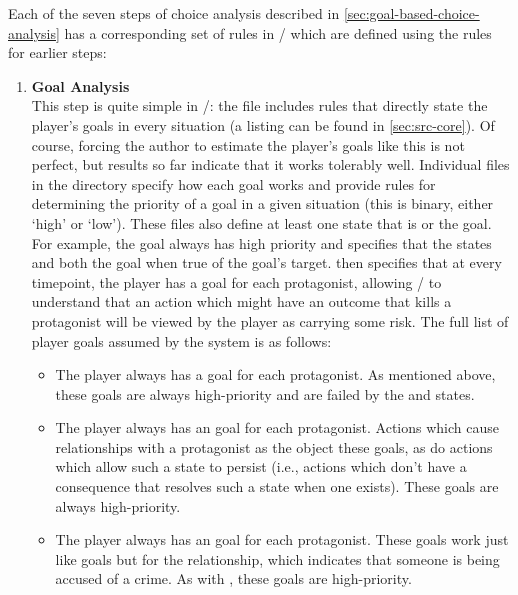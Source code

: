 Each of the seven steps of choice analysis described in \cref{sec:goal-based-choice-analysis} has a corresponding set of rules in \dunyazad/ which are defined using the rules for earlier steps:
%
\begin{enumerate}[leftmargin=1.4em]
\setlength{\parindent}{1.5em}
\item %
\textbf{Goal Analysis} \\
%
This step is quite simple in \dunyazad/: the file  includes rules that directly state the player's goals in every situation (a listing can be found in \cref{sec:src-core}).
%
Of course, forcing the author to estimate the player's goals like this is not perfect, but results so far indicate that it works tolerably well.
%
Individual files in the  directory specify how each goal works and provide rules for determining the priority of a goal in a given situation (this is binary, either `high' or `low').
%
These files also define at least one state that is    or  the goal.
%
For example, the  goal always has high priority and specifies that the states  and  both  the goal when true of the goal's target.
%
 then specifies that at every timepoint, the player has a  goal for each protagonist, allowing \dunyazad/ to understand that an action which might have an outcome that kills a protagonist will be viewed by the player as carrying some risk.
%
The full list of player goals assumed by the system is as follows:
%
\begin{itemize}
\item The player always has a  goal for each protagonist. As mentioned above, these goals are always high-priority and are failed by the  and  states.
\item The player always has an  goal for each protagonist. Actions which cause  relationships with a protagonist as the object  these goals, as do actions which allow such a state to persist (i.e., actions which don't have a consequence that resolves such a state when one exists). These goals are always high-priority.
\item The player always has an  goal for each protagonist. These goals work just like  goals but for the  relationship, which indicates that someone is being accused of a crime. As with , these goals are high-priority.

\end{itemize}
\end{enumerate}
